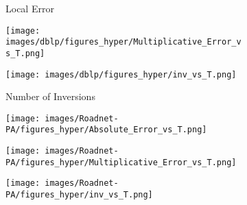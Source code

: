 \begin{figure*}[htbp]
\begin{subfigure}[b]{\textwidth}
\begin{minipage}[b]{0.3\textwidth}
		\end{minipage}%
		\begin{minipage}[b]{0.3\textwidth}
			\centering
			\caption*{Local Error} %
			\texttt{[image: images/dblp/figures\_hyper/Multiplicative\_Error\_vs\_T.png]} %
			
		\end{minipage}%
		\begin{minipage}[b]{0.3\textwidth}
			\centering
			\caption*{Number of Inversions} %
			\texttt{[image: images/dblp/figures\_hyper/inv\_vs\_T.png]} %
		\end{minipage}
	\end{subfigure}
	\begin{subfigure}[b]{\textwidth}
		\centering
		\begin{minipage}[b]{0.05\textwidth}
			\centering
		\end{minipage}%
		\begin{minipage}[b]{0.3\textwidth}
			\centering
			\texttt{[image: images/Roadnet-PA/figures\_hyper/Absolute\_Error\_vs\_T.png]} %
			
		\end{minipage}%
		\begin{minipage}[b]{0.3\textwidth}
			\centering
			
			\texttt{[image: images/Roadnet-PA/figures\_hyper/Multiplicative\_Error\_vs\_T.png]} %
			
		\end{minipage}%
		\begin{minipage}[b]{0.3\textwidth}
			\centering
			
			\texttt{[image: images/Roadnet-PA/figures\_hyper/inv\_vs\_T.png]} %
		\end{minipage}
		

\end{subfigure}
\end{figure*}
